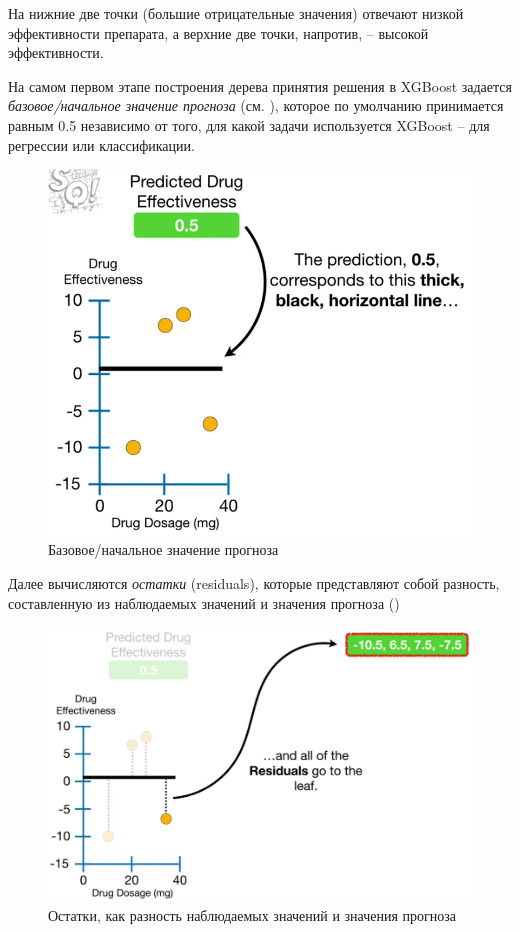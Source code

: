 \documentclass[%
	11pt,
	a4paper,
	utf8,
		]{article}
\begin{document}
На  нижние две точки (большие отрицательные значения) отвечают низкой эффективности препарата, а верхние две точки, напротив, -- высокой эффективности.

На самом первом этапе построения дерева принятия решения в XGBoost задается \emph{базовое/начальное значение прогноза} (см. ), которое по умолчанию принимается равным 0.5 независимо от того, для какой задачи используется XGBoost -- для регрессии или классификации.

\begin{figure}[h]
	\centering
	\includegraphics[scale=0.35]{figures/xgboost_initial_pred.png}
	\caption{ Базовое/начальное значение прогноза }\label{fig:xgboost_initial_pred}
\end{figure}

Далее вычисляются \emph{остатки} (residuals), которые представляют собой разность, составленную из наблюдаемых значений и значения прогноза ()

\begin{figure}[h]
	\centering
	\includegraphics[scale=0.35]{figures/xgboost_residuals.png}
	\caption{ Остатки, как разность наблюдаемых значений и значения прогноза }\label{fig:xgboost_residuals}
\end{figure}
\end{document}
